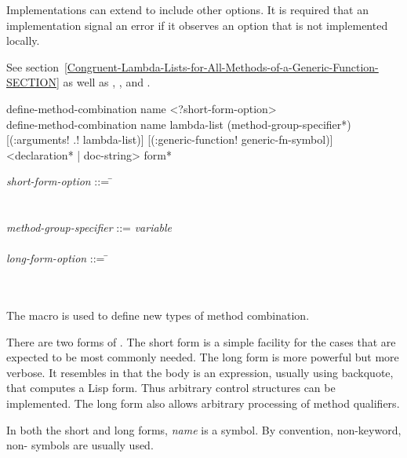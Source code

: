 \begin{defmac}
Implementations can extend  to include other options.
It is required that an implementation signal an error if
it observes an option that is not implemented locally.

See section~\ref{Congruent-Lambda-Lists-for-All-Methods-of-a-Generic-Function-SECTION}
as well as , , and .
\end{defmac}


\begin{defmac}
define-method-combination name <?short-form-option> \\
define-method-combination name lambda-list
    ({method-group-specifier}*)
    [(\!:arguments! \!.! lambda-list)]
    [(\!:generic-function! generic-fn-symbol)]
    <{declaration}* | doc-string>
    {form}*

\begin{tabbing}
\emph{short-form-option\/} ::= \= \\
\Mor~ \\
\Mor~  \\
\emph{method-group-specifier\/} ::= \cd{(}\=\emph{variable\/}
     \\
\>\cd{)} \\
\emph{long-form-option\/} ::= \= \\
\Mor~ \\
\Mor~
\end{tabbing}
The macro  is used to define new types
of method combination.

There are two forms of .  The short
form is a simple facility for the cases that are expected
to be most commonly needed.  The long form is more powerful but more
verbose.  It resembles  in that the body is an
expression, usually using backquote, that computes a Lisp form.  Thus
arbitrary control structures can be implemented.  The long form also
allows arbitrary processing of method qualifiers.





In both the short and long forms, \emph{name\/} is a symbol.  By convention,
non-keyword, non- symbols are usually used.


\end{defmac}
